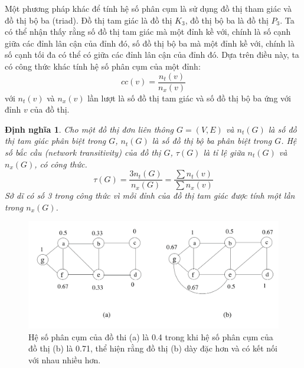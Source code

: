 \documentclass[14pt, oneside, a4paper, openany]{scrartcl}
\newtheorem{definition}{Định nghĩa}[section]
\begin{document}
Một phương pháp khác để tính hệ số phân cụm là sử dụng đồ thị tham giác và đồ thị bộ ba (triad). Đồ thị tam giác là đồ thị $K_3$, đồ thị bộ ba là đồ thị $P_3$. Ta có thể nhận thấy rằng số đồ thị tam giác mà một đỉnh kề với, chính là số cạnh giữa các đỉnh lân cận của đỉnh đó, số đồ thị bộ ba mà một đỉnh kề với, chính là số cạnh tối đa có thể có giữa các đỉnh lân cận của đỉnh đó.
Dựa trên điều này, ta có công thức khác tính hệ số phân cụm của một đỉnh:
\begin{equation}
	cc(v) = \frac{n_t(v)}{n_x(v)}
\end{equation}
với $n_t(v)$ và $n_x(v)$ lần lượt là số đồ thị tam giác và số đồ thị bộ ba ứng với đỉnh $v$ của đồ thị.

\begin{definition}
	\cite{complexnetwork} Cho một đồ thị đơn liên thông $G = (V,E)$ và $n_t(G)$ là số đồ thị tam giác phân biệt trong $G$, $n_t(G)$ là số đồ thị bộ ba phân biệt trong $G$. Hệ số bắc cầu  (network transitivity) của đồ thị $G$, $\tau(G)$ là tỉ lệ giữa $n_t(G)$ và $n_x(G)$, có công thức.
	\begin{equation}
		\tau(G) = \frac{3n_t(G)}{n_x(G)} = \frac{\sum n_t(v)}{\sum n_x(v)}
	\end{equation}
	Sở dĩ có số 3 trong công thức vì mỗi đỉnh của đồ thị tam giác được tính một lần trong $n_x(G)$.
\end{definition}

\begin{figure}[!h]
	\centering
	\includegraphics[scale=0.5]{figures/clustercoefficient.png} 
	\caption[Hệ số phân cụm]{Hệ số phân cụm của đồ thi (a) là 0.4 trong khi hệ số phân cụm của đồ thị (b) là 0.71, thể hiện rằng đồ thị (b) dày đặc hơn và có kết nối với nhau nhiều hơn.}
	\label{fig:clustercoeff}
\end{figure}

\end{document}
